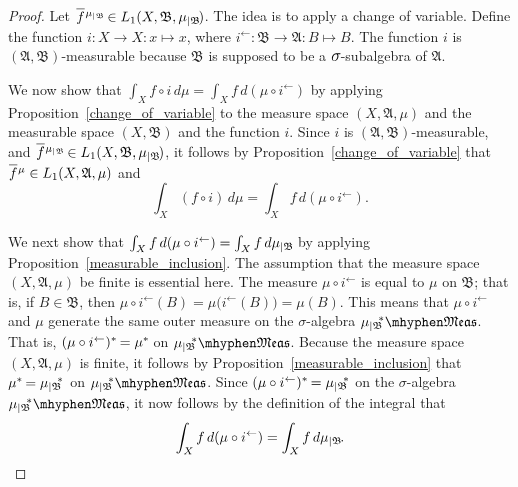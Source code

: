 \documentclass[
twoside=true,
paper=letter,
fontsize=11pt,
pagesize=auto,
leqno,
openany,
headsepline,
overfullrule,
]{scrbook}
\theoremstyle{plain}
\theoremstyle{plain}
\theoremstyle{definition}
\theoremstyle{bfnoteitalic}
\theoremstyle{bfnoteroman}
\newcommand{\sigalg}[1]{\mathfrak{#1}}
\newcommand{\textsigma}{\hbox{\large{$\sigma$}}\kern-1pt}
\newcommand{\restrictedto}[1]{_{\lvert#1}\kern-1.5pt}
\newcommand{\preimage}[1]{#1^{\leftarrow}}
\newcommand{\sigmaalgebra}{\sigalg{A}}
\newcommand{\sigmaalgebraii}{\sigalg{B}}
\newcommand{\measurable}[1]{{#1}\mhyphen\mathfrak{Meas}}
\newcommand{\kernast}{\ast\kern-1pt}
\newcommand{\measuresubstar}[1]{\measure\restrictedto{#1}\kern-2pt^*}
\newcommand{\measurespace}{X}
\newcommand{\mspaceelt}{x}
\newcommand{\measure}{\mu}
\newcommand*\xbar[1]{%
   \hbox{%
     \vbox{%
       \hrule height 0.4pt %
       \kern0.4ex%
       \hbox{%
         \ensuremath{#1}%
       }%
     }%
   }%
}
\newcommand{\lebclass}[1]{\hspace{.5pt}\xbar{#1}\hspace{0.5pt}}
\newcommand{\ellclass}[2]{\lebclass{#1}^{#2}}
\begin{document}
\begin{proof}
Let $\ellclass{f}{\measure\restrictedto{\sigmaalgebraii}}
\in L_1(\measurespace, \sigmaalgebraii, \measure\restrictedto{\sigmaalgebraii})$.
The idea is to apply a change of variable.
Define the function $i:\measurespace\to\measurespace:\mspaceelt\mapsto\mspaceelt$, where 
$\preimage{i}:\sigmaalgebraii\to\sigmaalgebra:B\mapsto B$.
The function 
$i$ is
$(\sigmaalgebra, \sigmaalgebraii)$\hyp{}measurable because $\sigmaalgebraii$ is supposed to be a 
$\textsigma$-subalgebra of $\sigmaalgebra$.



We now show that $\int_\measurespace f\circ i \, d\measure
= \int_\measurespace f \, d(\measure\circ\preimage i)$
by applying Proposition~\ref{change_of_variable} to the measure space $(\measurespace, \sigmaalgebra, \measure)$ and the measurable space $(\measurespace, \sigmaalgebraii)$ and the function $i$. 
Since $i$ is
$(\sigmaalgebra, \sigmaalgebraii)$\hyp{}measurable, and
$\ellclass{f}{\measure\restrictedto{\sigmaalgebraii}}
\in L_1(\measurespace, \sigmaalgebraii, \measure\restrictedto{\sigmaalgebraii})
$,
it follows by Proposition~\ref{change_of_variable} that 
$\ellclass{f}{\measure}
\in L_1(\measurespace, \sigmaalgebra, \measure)$ and
\[
\int_\measurespace (f\circ i) \, d\measure
= \int_\measurespace f \, d(\measure\circ\preimage i).
\]



We next show that 
$\int_\measurespace f \, d(\measure\circ\preimage{i})
= \int_\measurespace f \, d \measure\restrictedto{\sigmaalgebraii}$ 
by applying Proposition~\ref{measurable_inclusion}.
The assumption that the measure space $(\measurespace, \sigmaalgebra, \measure)$ be finite is essential here.
The measure $\measure\circ\preimage i$ is equal to $\measure$ on $\sigmaalgebraii$; that is, if $B\in\sigmaalgebraii$, then $\measure\circ\preimage i(B) = \measure\bigl(\preimage{i}(B)\bigr) = \measure(B)$.  
This means that $\measure\circ\preimage i$ and $\measure$ generate the same outer measure on the \textsigma-algebra
$\measurable{\measuresubstar{\sigmaalgebraii}}$. That is, $(\measure\circ\preimage i)^\kernast = \measure^\kernast$
on $\measurable{\measuresubstar{\sigmaalgebraii}}$.
Because the measure space 
$(\measurespace, \sigmaalgebra, \measure)$ is finite, it follows by Proposition~\ref{measurable_inclusion} that 
$\measure^\kernast = \measuresubstar{\sigmaalgebraii}$ on $\measurable{\measuresubstar{\sigmaalgebraii}}$.
Since 
$(\measure\circ\preimage i)^\kernast = \measuresubstar{\sigmaalgebraii}$ on the \textsigma-algebra $\measurable{\measuresubstar{\sigmaalgebraii}}$,
it now follows by the definition of the integral that 
\[
\int_\measurespace f \, d(\measure\circ\preimage{i})
= \int_\measurespace f \, d \measure\restrictedto{\sigmaalgebraii}.
\]




\end{proof}
\end{document}

